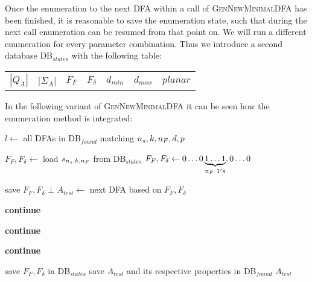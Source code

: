 Once the enumeration to the next DFA within a call of \textsc{GenNewMinimalDFA} has been finished, it is reasonable to save the enumeration state, such that during the next call enumeration can be resumed from that point on. We will run a different enumeration for every parameter combination. Thus we introduce a second database DB$_{states}$ with the following table:
\begin{center}
	\begin{tabular}{c c c c c c c}
		$|Q_A|$ & |$\Sigma_A$| & $F_F$ & $F_\delta$ & $d_{min}$ & $d_{max}$ & $planar$
	\end{tabular}
\end{center}
In the following variant of \textsc{GenNewMinimalDFA} it can be seen how the enumeration method is integrated:
\vspace{0.2cm}
\begin{algorithmic}[1]
	
		\vspace{0.2cm}
	
		\State $l \gets$ all DFAs in DB$_{found}$ matching ${n_s}, k, {n_F}, d, p$
		
		\vspace{0.2cm}
		
			\State $F_F, F_\delta \gets$ load $s_{{n_s}, k, {n_F}}$ from DB$_{states}$
		\Else
			\State $F_F,F_\delta \gets 0\ldots0\underbrace{1\ldots1}_{{n_F}\ 1's}, 0\ldots0$
		\EndIf
		
		\vspace{-0.2cm}
		\newpage
		
			\vspace{0.2cm}
		
				\State save $F_F, F_\delta$
				\State\Return $\bot$
			\EndIf
			\State $A_{test} \gets$ next DFA based on $F_F, F_\delta$
			
			\vspace{0.2cm}
			
				\State \textbf{continue}
			\EndIf
			
				\State \textbf{continue}
			\EndIf
			
				\State \textbf{continue}
			\EndIf
			
			\vspace{0.2cm}
			
			\State save $F_F, F_\delta$ in DB$_{states}$
			\State save $A_{test}$ and its respective properties in DB$_{found}$
			\State\Return $A_{test}$
		\EndWhile
	\EndFunction
\end{algorithmic}
\vspace{0.2cm}

